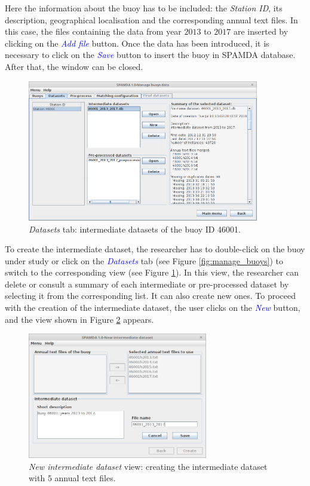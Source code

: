 \documentclass[review]{elsarticle}
\begin{document}
			Here the information about the buoy has to be included: the \textit{Station ID}, its description, geographical localisation and the corresponding annual text files. In this case, the files containing the data from year $2013$ to $2017$ are inserted by clicking on the \textcolor{blue}{\textit{Add file}} button. Once the data has been introduced, it is necessary to click on the \textcolor{blue}{\textit{Save}} button to insert the buoy in SPAMDA database. After that, the window can be closed.  
		
			\begin{figure}[ht!]
				\centering
				\includegraphics[width=0.90\textwidth]{figures/FigureDatasets.png}
				\caption{\textit{Datasets} tab: intermediate datasets of the buoy ID 46001.}\label{fig:show_datasets}
			\end{figure}
			
			To create the intermediate dataset, the researcher has to double-click on the buoy under study or click on the \textcolor{blue}{\textit{Datasets}} tab (see Figure \ref{fig:manage_buoys}) to switch to the corresponding view (see Figure \ref{fig:show_datasets}). In this view, the researcher can delete or consult a summary of each intermediate or pre-processed dataset by selecting it from the corresponding list. It can also create new ones. To proceed with the creation of the intermediate dataset, the user clicks on the \textcolor{blue}{\textit{New}} button, and the view shown in Figure \ref{fig:intermediate} appears. 
			
			\begin{figure}[ht!]
				\centering
				\includegraphics[width=0.70\textwidth]{figures/FigureNew_intermediate_dataset.png}
				\caption{\textit{New intermediate dataset} view: creating the intermediate dataset with $5$ annual text files.}\label{fig:intermediate}
			\end{figure}
			
\end{document}
